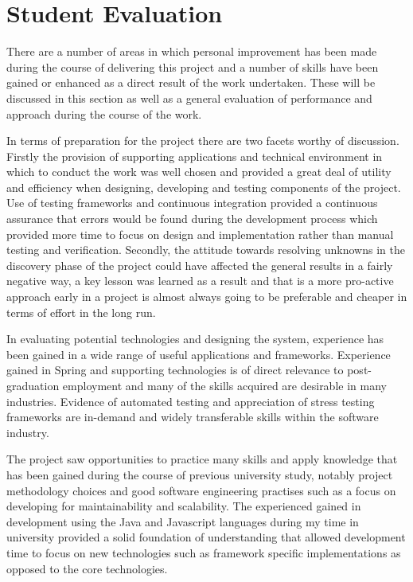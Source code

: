 \section{Student Evaluation}

There are a number of areas in which personal improvement has been made during the course of delivering this project and a number of skills have been gained or enhanced as a direct result of the work undertaken. These will be discussed in this section as well as a general evaluation of performance and approach during the course of the work.

In terms of preparation for the project there are two facets worthy of discussion. Firstly the provision of supporting applications and technical environment in which to conduct the work was well chosen and provided a great deal of utility and efficiency when designing, developing and testing components of the project. Use of testing frameworks and continuous integration provided a continuous assurance that errors would be found during the development process which provided more time to focus on design and implementation rather than manual testing and verification. Secondly, the attitude towards resolving unknowns in the discovery phase of the project could have affected the general results in a fairly negative way, a key lesson was learned as a result and that is a more pro-active approach early in a project is almost always going to be preferable and cheaper in terms of effort in the long run.

In evaluating potential technologies and designing the system, experience has been gained in a wide range of useful applications and frameworks. Experience gained in Spring and supporting technologies is of direct relevance to post-graduation employment and many of the skills acquired are desirable in many industries. Evidence of automated testing and appreciation of stress testing frameworks are in-demand and widely transferable skills within the software industry.

The project saw opportunities to practice many skills and apply knowledge that has been gained during the course of previous university study, notably project methodology choices and good software engineering practises such as a focus on developing for maintainability and scalability. The experienced gained in development using the Java and Javascript languages during my time in university provided a solid foundation of understanding that allowed development time to focus on new technologies such as framework specific implementations as opposed to the core  technologies.

